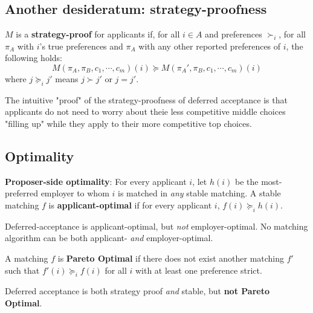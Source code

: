 \documentclass[titlepage, 12pt, leqno]{article}
\begin{document}
\subsection{Another desideratum: strategy-proofness}
\begin{definition}
    $M$ is a \textbf{strategy-proof} for applicants if, for all $i \in A$ and
    preferences $\succ_i$, for all $\pi_A$ with $i$'s true preferences and 
    $\pi_A$ with any other reported preferences of $i$, the following holds:
    \[
    M(\pi_A, \pi_B, c_1, \cdots ,c_m)(i) \succeq M(\pi_A', \pi_B, c_1, \cdots 
    ,c_m)(i)
    \]
    where $j \succeq_i j'$ means $j \succ j'$ or $j = j'$.
\end{definition}
The intuitive "proof" of the strategy-proofness of deferred acceptance is that
applicants do not need to worry about theie less competitive middle choices
"filling up" while they apply to their more competitive top choices.

\subsection{Optimality}
\begin{definition}
    \textbf{Proposer-side optimality}: For every applicant $i$, let $h(i)$ be the
    most-preferred employer to whom $i$ is matched in \textit{any} stable
    matching. A stable matching $f$ is \textbf{applicant-optimal} if for every
    applicant $i$, $f(i) \succeq_i h(i)$.
\end{definition}

Deferred-acceptance is applicant-optimal, but \textit{not} employer-optimal. No
matching algorithm can be both applicant- \textit{and} employer-optimal.

\begin{definition}
    A matching $f$ is \textbf{Pareto Optimal} if there does not exist another
    matching $f'$ such that $f'(i) \succeq_i f(i)$ for all $i$ with at least one
    preference strict.
\end{definition}

Deferred acceptance is both strategy proof \textit{and} stable, but \textbf{not
Pareto Optimal}.
\end{document}
